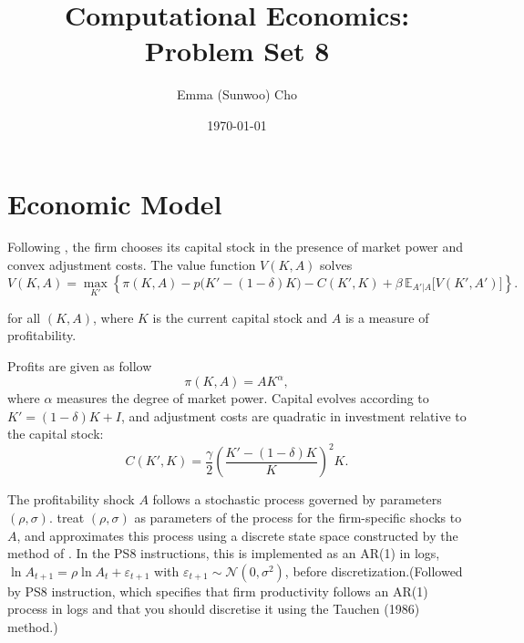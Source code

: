 \documentclass[11pt]{article}
\title{Computational Economics: Problem Set 8}
\author{Emma (Sunwoo) Cho}
\date{\today}  %
\begin{document}
\maketitle

\section{Economic Model}

Following \cite{CooperEjarque2003}, the firm chooses its capital stock in the presence of market power and convex adjustment costs. The value function $V(K,A)$ solves
\begin{equation}
  V(K,A)
  =
  \max_{K'}
  \left\{
    \pi(K,A)
    - p\bigl(K' - (1-\delta)K\bigr)
    - C(K',K)
    + \beta\,\mathbb{E}_{A'|A}\bigl[ V(K',A') \bigr]
  \right\}.
  \label{eq:bellman_basic}
\end{equation}

for all $(K,A)$, where $K$ is the current capital stock and $A$ is a measure of profitability. 


Profits are given as follow
\begin{equation}
  \pi(K,A) = A K^{\alpha},
\end{equation}
where $\alpha$ measures the degree of market power. 
Capital evolves according to $K' = (1-\delta)K + I$, and adjustment costs are quadratic in investment relative to the capital stock:
\begin{equation}
  C(K',K)
  =
  \frac{\gamma}{2}
  \left( \frac{K' - (1-\delta)K}{K} \right)^{2} K.
\end{equation}

The profitability shock $A$ follows a stochastic process governed by parameters $(\rho,\sigma)$. \cite{CooperEjarque2003} treat $(\rho,\sigma)$ as parameters of the process for the firm-specific shocks to $A$, and approximates this process using a discrete state space constructed by the method of \cite{Tauchen1986}. 
In the PS8 instructions, this is implemented as an AR(1) in logs, $\ln A_{t+1} = \rho \ln A_t + \varepsilon_{t+1}$ with $\varepsilon_{t+1} \sim \mathcal{N}(0,\sigma^2)$, before discretization.(Followed by PS8 instruction, which specifies that firm productivity follows an AR(1) process in logs and that you should discretise it using the Tauchen (1986) method.)
\end{document}
